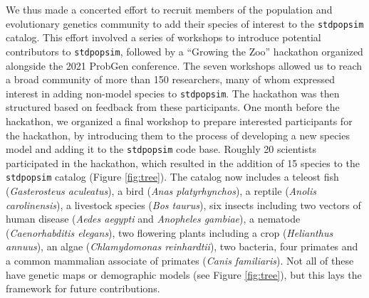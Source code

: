 \documentclass[hidelinks]{article}
\newcommand{\stdpopsim}{\texttt{stdpopsim}\xspace}
\begin{document}
We thus made a concerted effort
to recruit members of the population and evolutionary genetics community
to add their species of interest to the \stdpopsim catalog.
This effort involved a series of workshops to introduce potential contributors to \stdpopsim, followed by a ``Growing the Zoo'' hackathon organized alongside the 2021 ProbGen conference.
The seven workshops allowed us to reach a broad community of more than 150 researchers,
many of whom expressed interest in adding non-model species to \stdpopsim.
The hackathon was then structured based on feedback from these participants.
One month before the hackathon, we organized a final workshop to prepare interested
participants for the hackathon, by introducing them to  the process of developing
a new species model and adding it to the \stdpopsim code base.
Roughly 20 scientists participated in the hackathon,
which resulted in the addition of 15 species to the \stdpopsim catalog
(Figure \ref{fig:tree}).
The catalog now includes
a teleost fish (\textit{Gasterosteus aculeatus}),
a bird (\textit{Anas platyrhynchos}),
a reptile (\textit{Anolis carolinensis}),
a livestock species (\textit{Bos taurus}),
six insects including two vectors of human disease (\textit{Aedes aegypti} and \textit{Anopheles gambiae}),
a nematode (\textit{Caenorhabditis elegans}),
two flowering plants including a crop (\textit{Helianthus annuus}),
an algae (\textit{Chlamydomonas reinhardtii}),
two bacteria,
four primates and a common mammalian associate of primates (\textit{Canis familiaris}).
Not all of these have genetic maps or demographic models (see Figure \ref{fig:tree}),
but this lays the framework for future contributions.
\end{document}
